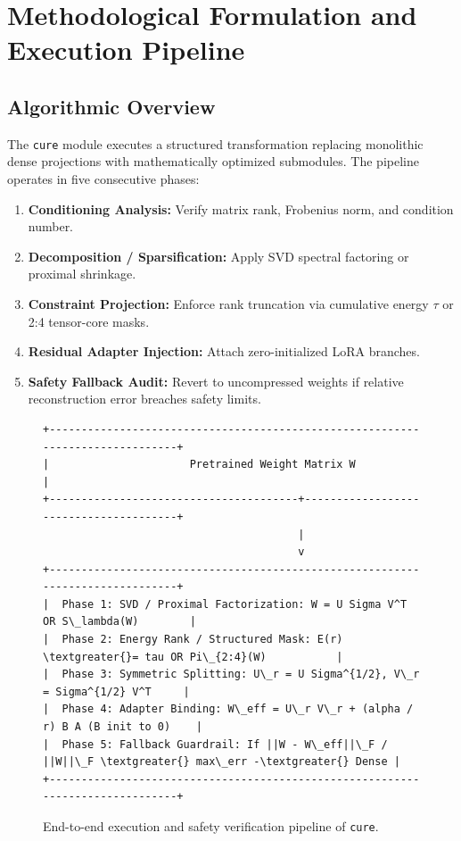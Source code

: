 \section{Methodological Formulation and Execution Pipeline}

\subsection{Algorithmic Overview}
The \texttt{cure} module executes a structured transformation replacing monolithic dense projections with mathematically optimized submodules. The pipeline operates in five consecutive phases:
\begin{enumerate}
\item \textbf{Conditioning Analysis:} Verify matrix rank, Frobenius norm, and condition number.
\item \textbf{Decomposition / Sparsification:} Apply SVD spectral factoring or proximal shrinkage.
\item \textbf{Constraint Projection:} Enforce rank truncation via cumulative energy $\tau$ or 2:4 tensor-core masks.
\item \textbf{Residual Adapter Injection:} Attach zero-initialized LoRA branches.
\item \textbf{Safety Fallback Audit:} Revert to uncompressed weights if relative reconstruction error breaches safety limits.
\end{enumerate}

\begin{figure}[t]
\centering
\begin{verbatim}
+-------------------------------------------------------------------------------+
|                      Pretrained Weight Matrix W                               |
+---------------------------------------+---------------------------------------+
                                        |
                                        v
+-------------------------------------------------------------------------------+
|  Phase 1: SVD / Proximal Factorization: W = U Sigma V^T OR S\_lambda(W)        |
|  Phase 2: Energy Rank / Structured Mask: E(r) \textgreater{}= tau OR Pi\_{2:4}(W)           |
|  Phase 3: Symmetric Splitting: U\_r = U Sigma^{1/2}, V\_r = Sigma^{1/2} V^T     |
|  Phase 4: Adapter Binding: W\_eff = U\_r V\_r + (alpha / r) B A (B init to 0)    |
|  Phase 5: Fallback Guardrail: If ||W - W\_eff||\_F / ||W||\_F \textgreater{} max\_err -\textgreater{} Dense |
+-------------------------------------------------------------------------------+
\end{verbatim}
\caption{End-to-end execution and safety verification pipeline of \texttt{cure}.}
\end{figure}

